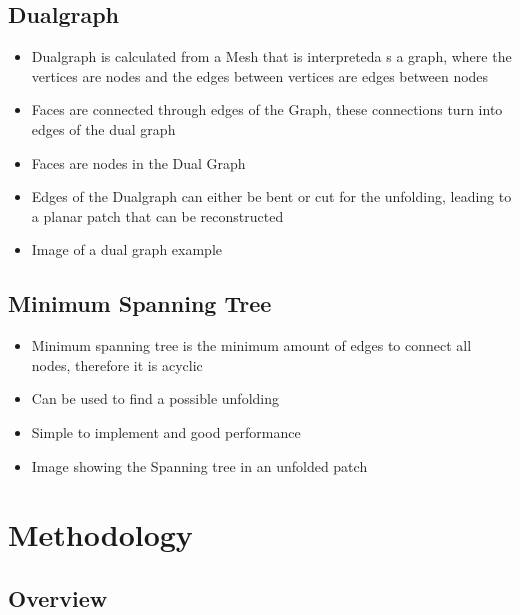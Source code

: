 \documentclass[draft,final]{vutinfth} %
\begin{document}
\section{Dualgraph}

\begin{itemize}
	\item Dualgraph is calculated from a Mesh that is interpreteda s a graph, where the vertices are nodes and the edges between vertices are edges between nodes
	\item Faces are connected through edges of the Graph, these connections turn into edges of the dual graph
	\item Faces are nodes in the Dual Graph
	\item Edges of the Dualgraph can either be bent or cut for the unfolding, leading to a planar patch that can be reconstructed
	\item Image of a dual graph example
\end{itemize}

\section{Minimum Spanning Tree}

\begin{itemize}
	\item Minimum spanning tree is the minimum amount of edges to connect all nodes, therefore it is acyclic
	\item Can be used to find a possible unfolding
	\item Simple to implement and good performance
	\item Image showing the Spanning tree in an unfolded patch
\end{itemize}

\chapter{Methodology}

\section{Overview}

\end{document}
